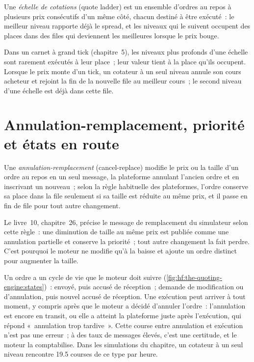 \begin{definition}\label{def:hf:the-quoting-engine:ladder}
Une \emph{échelle de cotations} (quote ladder) est un ensemble d'ordres au repos à plusieurs prix consécutifs d'un même côté, chacun destiné à être exécuté~: le meilleur
niveau rapporte déjà le spread, et les niveaux qui le suivent occupent des places dans des files qui deviennent les meilleures lorsque le prix bouge.
\end{definition}

Dans un carnet à grand tick (chapitre~5), les niveaux plus profonds d'une échelle sont rarement exécutés à leur place~; leur valeur tient à la place qu'ils occupent. Lorsque le prix monte d'un tick,
un cotateur à un seul niveau annule son cours acheteur et rejoint la fin de la nouvelle file au meilleur cours~; le second niveau d'une échelle est déjà dans cette file.

\section{Annulation-remplacement, priorité et états en route}

\begin{definition}\label{def:hf:the-quoting-engine:replace}
Une \emph{annulation-remplacement} (cancel-replace) modifie le prix ou la taille d'un ordre au repos en un seul message, la plateforme annulant l'ancien ordre
et en inscrivant un nouveau~; selon la règle habituelle des plateformes, l'ordre conserve sa place dans la file seulement si sa taille est réduite au même prix, et il passe en fin de file
pour tout autre changement.
\end{definition}

Le livre~10, chapitre~26, précise le message de remplacement du simulateur selon cette règle~: une diminution de taille au même prix est publiée comme
une annulation partielle et conserve la priorité~; tout autre changement la fait perdre. C'est pourquoi le moteur ne modifie qu'à la baisse et ajoute un ordre distinct pour augmenter la taille.

Un ordre a un cycle de vie que le moteur doit suivre (\cref{fig:hf:the-quoting-engine:states})~: envoyé, puis accusé de réception~; demande de modification ou d'annulation, puis nouvel accusé de réception. Une exécution peut arriver à tout
moment, y compris après que le moteur a décidé d'annuler l'ordre~: l'annulation est encore en transit, ou elle a atteint la plateforme juste après l'exécution, qui répond
«~annulation trop tardive~». Cette course entre annulation et exécution n'est pas une erreur~; à des taux de messages élevés, c'est une certitude, et le moteur la comptabilise. Dans les
simulations du chapitre, un cotateur à un seul niveau rencontre 19.5 courses de ce type par heure.

